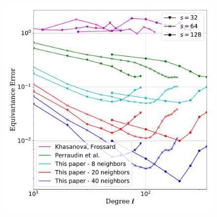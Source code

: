 \documentclass{article} %
\begin{document}
\begin{figure}
	\begin{minipage}{0.6\linewidth}
		\centering
		\includegraphics[width=1\linewidth]{all_in_one.pdf}


\end{minipage}
\end{figure}
\end{document}
